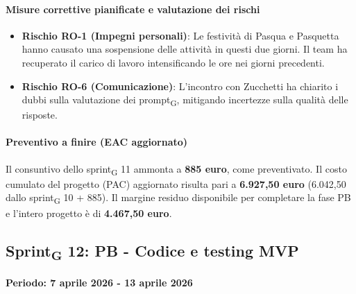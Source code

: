 \documentclass[11pt,a4paper]{article}
\newcommand{\gls}[1]{#1\textsubscript{G}}
\begin{document}
\paragraph{Misure correttive pianificate e valutazione dei rischi}
\begin{itemize}
    \item \textbf{Rischio RO-1 (Impegni personali)}: Le festività di Pasqua e Pasquetta hanno causato una sospensione delle attività in questi due giorni. Il team ha recuperato il carico di lavoro intensificando le ore nei giorni precedenti.
    \item \textbf{Rischio RO-6 (Comunicazione)}: L'incontro con Zucchetti ha chiarito i dubbi sulla valutazione dei \gls{prompt}, mitigando incertezze sulla qualità delle risposte.
\end{itemize}

\paragraph{Preventivo a finire (EAC aggiornato)}
Il consuntivo dello \gls{sprint} 11 ammonta a \textbf{885 euro}, come preventivato.
Il costo cumulato del progetto (PAC) aggiornato risulta pari a \textbf{6.927,50 euro} (6.042,50 dallo \gls{sprint} 10 + 885). 
Il margine residuo disponibile per completare la fase PB e l'intero progetto è di \textbf{4.467,50 euro}.

\newpage


\subsection{\gls{Sprint} 12: PB - Codice e testing MVP}
{\textbf{Periodo: 7 aprile 2026 - 13 aprile 2026}\par}
\end{document}

